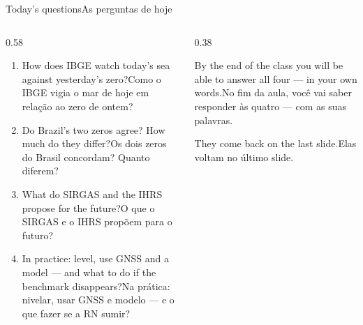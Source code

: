 \documentclass[aspectratio=169,11pt]{beamer}
\newcommand{\tr}[2]{\ifEN#2\else#1\fi}
\begin{document}
\begin{frame}{\tr{As perguntas de hoje}{Today's questions}}
  \begin{columns}[T]
    \begin{column}{0.58\textwidth}
      \begin{enumerate}
        \setlength{\itemsep}{8pt}
        \item \tr{Como o IBGE vigia o mar de hoje em relação ao zero de ontem?}{How does IBGE
              watch today's sea against yesterday's zero?}
        \item \tr{Os dois zeros do Brasil concordam? Quanto diferem?}{Do Brazil's two zeros
              agree? How much do they differ?}
        \item \tr{O que o SIRGAS e o IHRS propõem para o futuro?}{What do SIRGAS and the IHRS
              propose for the future?}
        \item \tr{Na prática: nivelar, usar GNSS e modelo --- e o que fazer se a RN
              sumir?}{In practice: level, use GNSS and a model --- and what to do if the
              benchmark disappears?}
      \end{enumerate}
    \end{column}
    \begin{column}{0.38\textwidth}
      \begin{ideia}[title={\tr{Combinado}{Deal}}]
        \tr{No fim da aula, você vai saber responder às quatro --- com as suas
        palavras.}{By the end of the class you will be able to answer all four --- in your own
        words.}
        \medskip

        \tr{Elas voltam no último slide.}{They come back on the last slide.}
      \end{ideia}
    \end{column}
  \end{columns}
\end{frame}
\end{document}
